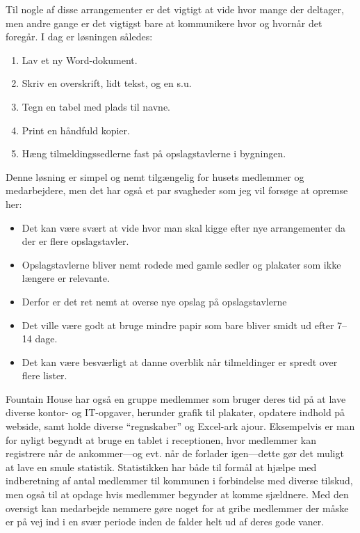 \documentclass[../main]{subfiles}
\begin{document}
    Til nogle af disse arrangementer er det vigtigt at vide hvor mange der deltager, men andre gange er det vigtigst bare at kommunikere hvor og hvornår det foregår.
    \enskip
    I dag er løsningen således:
    \begin{enumerate}
        \item Lav et ny Word-dokument.
        \item Skriv en overskrift, lidt tekst, og en s.u.
        \item Tegn en tabel med plads til navne.
        \item Print en håndfuld kopier.
        \item Hæng tilmeldingssedlerne fast på opslagstavlerne i bygningen.
    \end{enumerate}

    Denne løsning er simpel og nemt tilgængelig for husets medlemmer og medarbejdere, men det har også et par svagheder som jeg vil forsøge at opremse her:

    \begin{itemize}
        \item Det kan være svært at vide hvor man skal kigge efter nye arrangementer da der er flere opslagstavler.
        \item Opslagstavlerne bliver nemt rodede med gamle sedler og plakater som ikke længere er relevante.
        \item Derfor er det ret nemt at overse nye opslag på opslagstavlerne
        \item Det ville være godt at bruge mindre papir som bare bliver smidt ud efter 7–14 dage.
        \item Det kan være besværligt at danne overblik når tilmeldinger er spredt over flere lister.
    \end{itemize}

    Fountain House har også en gruppe medlemmer som bruger deres tid på at lave diverse kontor- og IT-opgaver, herunder grafik til plakater, opdatere indhold på webside, samt holde diverse
    \enquote{regnskaber} og Excel-ark ajour.
    \enskip
    Eksempelvis er man for nyligt begyndt at bruge en tablet i receptionen, hvor medlemmer kan registrere når de ankommer—og evt. når de forlader igen—dette gør det muligt at lave en smule statistik.
    \enskip
    Statistikken har både til formål at hjælpe med indberetning af antal medlemmer til kommunen i forbindelse med diverse tilskud, men også til at opdage hvis medlemmer begynder at komme sjældnere.
    \enskip
    Med den oversigt kan medarbejde nemmere gøre noget for at gribe medlemmer der måske er på vej ind i en svær periode inden de falder helt ud af deres gode vaner.
\end{document}
